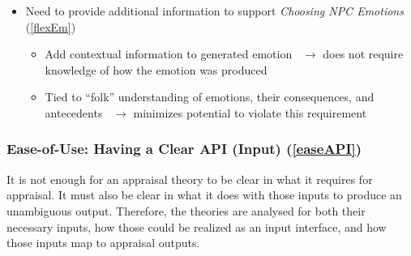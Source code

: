 \begin{itemize}
\begin{itemize}
        \item Need to provide additional information to support
        \textit{Choosing NPC Emotions} (\ref{flexEm})
        \begin{itemize}
            \item Add contextual information to generated
            emotion~\citep[p.~76--78]{oatley1992best} $\rightarrow$ does not
            require knowledge of how the emotion was produced

            \item Tied to ``folk'' understanding of emotions, their
            consequences, and antecedents~\citep[p.~214--215]{johnson1992basic}
            $\rightarrow$ minimizes potential to violate this requirement
        \end{itemize}
    \end{itemize}
\end{itemize}

\subsubsection{Ease-of-Use: Having a Clear API (Input) (\ref{easeAPI})}
It is not enough for an appraisal theory to be clear in what it requires for
appraisal. It must also be clear in what it does with those inputs to produce
an unambiguous output. Therefore, the theories are analysed for both their
necessary inputs, how those could be realized as an input interface, and how
those inputs map to appraisal outputs.

